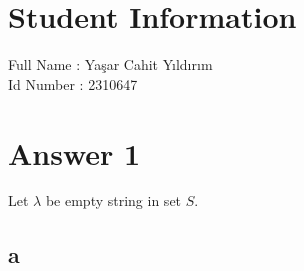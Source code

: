 \documentclass[11pt]{article}
\begin{document}
\section*{Student Information } 
Full Name : Yaşar Cahit Yıldırım \\
Id Number : 2310647 \\

\section*{Answer 1}
Let $\lambda$ be empty string in set $S$.
\subsection*{a}
\end{document}
